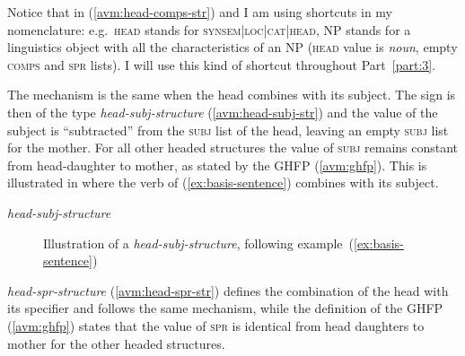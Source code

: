 Notice that in (\ref{avm:head-comps-str}) and  I am using shortcuts in my nomenclature: e.g.\ \textsc{head} stands for \textsc{synsem|loc|cat|head}, NP stands for a linguistics object with all the characteristics of an NP (\textsc{head} value is \emph{noun}, empty \textsc{comps} and \textsc{spr} lists). I will use this kind of shortcut throughout Part~\ref{part:3}.

The mechanism is the same when the head combines with its subject. The sign is then of the type \emph{head-subj-structure} (\ref{avm:head-subj-str}) and the value of the subject is ``subtracted'' from the \textsc{subj} list of the head, leaving an empty \textsc{subj} list for the mother. For all other headed structures the value of \textsc{subj} remains constant from head-daughter to mother, as stated by the GHFP (\ref{avm:ghfp}). This is illustrated in  where the verb of  (\ref{ex:basis-sentence}) combines with its subject. 

\ea \textit{head-subj-structure}
\label{avm:head-subj-str}
\z 

\begin{figure}[ht]
\caption{Illustration of a \textit{head-subj-structure}, following example~(\ref{ex:basis-sentence})}
\label{fig:ex:avm-spr-verb}
\end{figure}

\emph{head-spr-structure} (\ref{avm:head-spr-str}) defines the combination of the head with its specifier and follows the same mechanism, while the definition of the GHFP (\ref{avm:ghfp}) states that the value of \textsc{spr} is identical from head daughters to mother for the other headed structures. 

